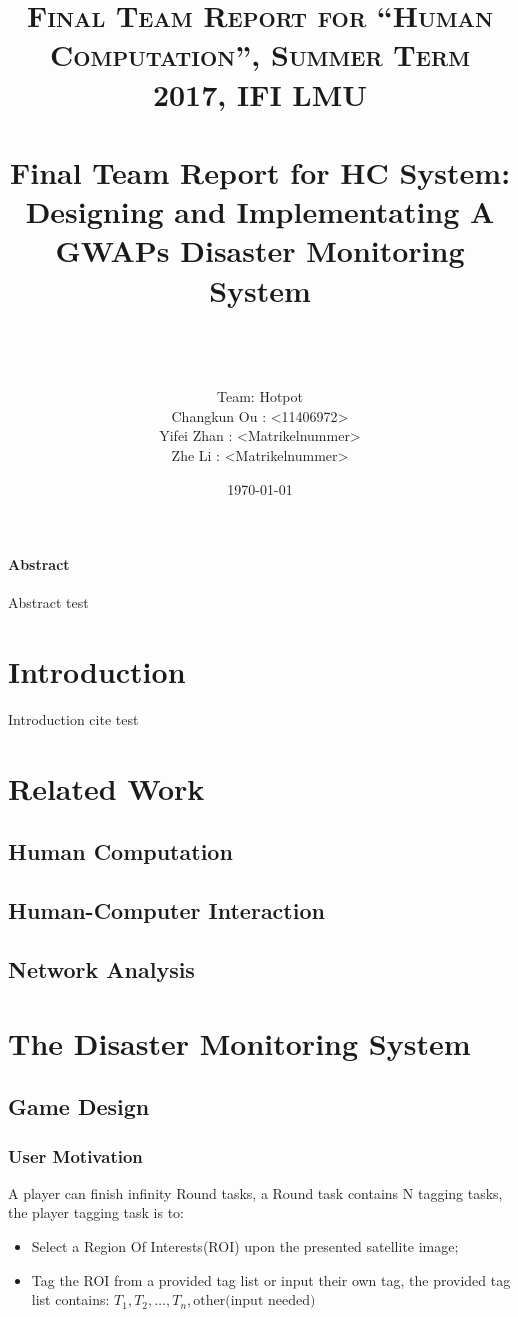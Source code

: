 \documentclass[paper=a4, fontsize=11pt]{scrartcl} %
\title{	
\normalfont \normalsize 
\textsc{Final Team Report for ``Human Computation'', Summer Term 2017, IFI LMU} \\ [25pt]
\horrule{0.5pt} \\[0.4cm] %
\huge Final Team Report for HC System: \\
Designing and Implementating A GWAPs Disaster Monitoring System\\%
\horrule{2pt} \\[0.5cm] %
}
\author{\\ Team: Hotpot\\Changkun Ou : <11406972> \\Yifei Zhan : <Matrikelnummer> \\Zhe Li : <Matrikelnummer>  }
\date{\today}
\numberwithin{equation}{section} %
\numberwithin{figure}{section} %
\numberwithin{table}{section} %
\begin{document}
\maketitle %

\tableofcontents

\paragraph{Abstract}

Abstract test

\section{Introduction}
Introduction cite test \cite{Bry2013} 

\section{Related Work}
  \subsection{Human Computation}
  \subsection{Human-Computer Interaction}
  \subsection{Network Analysis}

\section{The Disaster Monitoring System}

  \subsection{Game Design}
    \subsubsection{User Motivation}

    A player can finish infinity Round tasks, 
    a Round task contains {N} tagging tasks, 
    the player tagging task is to:

    \begin{itemize}
      \item Select a Region Of Interests(ROI) upon the presented satellite image;
      \item Tag the ROI from a provided tag list or input their own tag, the provided tag list contains: $T_1, T_2, …, T_n, \text{other(input needed)}$
    \end{itemize}
\end{document}
